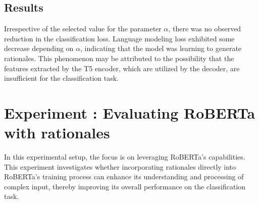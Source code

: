 \subsection*{Results}

Irrespective of the selected value for the parameter $\alpha$, there was no observed reduction in the classification loss. Language modeling loss exhibited some decrease depending on $\alpha$, indicating that the model was learning to generate rationales. This phenomenon may be attributed to the possibility that the features extracted by the T5 encoder, which are utilized by the decoder, are insufficient for the classification task.






\section{Experiment \theexperiment: Evaluating RoBERTa with rationales}
\label{sec:roberta_rationales}

In this experimental setup, the focus is on leveraging RoBERTa's capabilities. This experiment investigates whether incorporating rationales directly into RoBERTa's training process can enhance its understanding and processing of complex input, thereby improving its overall performance on the classification task.

